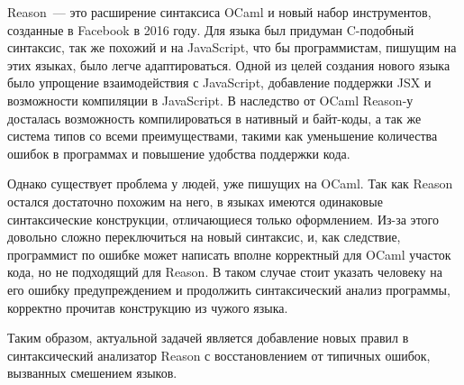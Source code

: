 Reason~--- это расширение синтаксиса OCaml и новый набор инструментов, созданные в Facebook в 2016 году. Для языка был придуман C-подобный синтаксис, так же похожий и на JavaScript, что бы программистам, пишущим на этих языках, было легче адаптироваться\cite{RE}. Одной из целей создания нового языка было упрощение взаимодействия с JavaScript, добавление поддержки JSX и возможности компиляции в JavaScript\cite{WE}. В наследство от OCaml Reason-у досталась возможность компилироваться в нативный и байт-коды, а так же система типов со всеми преимуществами, такими как уменьшение количества ошибок в программах и повышение удобства поддержки кода.

Однако существует проблема у людей, уже пишущих на OCaml. Так как Reason остался достаточно похожим на него, в языках имеются одинаковые синтаксические конструкции, отличающиеся только оформлением. Из-за этого довольно сложно переключиться на новый синтаксис, и, как следствие, программист по ошибке может написать вполне корректный для OCaml участок кода, но не подходящий для Reason. В таком случае стоит указать человеку на его ошибку предупреждением и продолжить синтаксический анализ программы, корректно прочитав конструкцию из чужого языка.

Таким образом, актуальной задачей является добавление новых правил в синтаксический анализатор Reason с восстановлением от типичных ошибок, вызванных смешением языков.